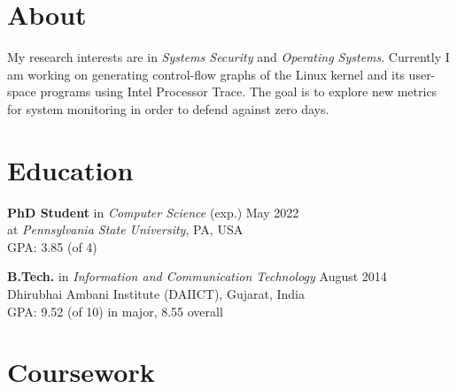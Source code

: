 \documentclass[margin]{res}
\newcommand{\daiict}{\textsc{DAIICT}}
\begin{document}
\raggedright
{} %

\address{
    blog:// \href{http://adityabasu.me}{adityabasu.me}\\
    github:// \href{https://github.com/mitthu}{mitthu}\\
    linkedIn://  \href{https://www.linkedin.com/in/mitthu}{mitthu}
}

\address{
    W106 Westgate Building\\
    University Park, PA 16802\\
    (814) 862-8300\\
    \href{mailto:aditya.basu@psu.edu}{aditya.basu@psu.edu}
}

\begin{resume}

\section{About}
My research interests are in \emph{Systems Security} and \emph{Operating Systems}.
Currently I am working on generating control-flow graphs of the Linux kernel and its 
user-space programs using Intel\textsuperscript{\textregistered} Processor Trace.
The goal is to explore new metrics for system monitoring in order to defend against zero days.

\section{Education}

\textbf{PhD Student} in \emph{Computer Science} \hfill (exp.) May 2022\\
at \emph{Pennsylvania State University}, PA, USA\\
GPA: 3.85 (of 4)

\textbf{B.Tech.} in \emph{Information and Communication Technology} \hfill August 2014\\
Dhirubhai Ambani Institute (\daiict), Gujarat, India\\
GPA: 9.52 (of 10) in major,
8.55 overall 

\section{Coursework}


\end{resume}
\end{document}
